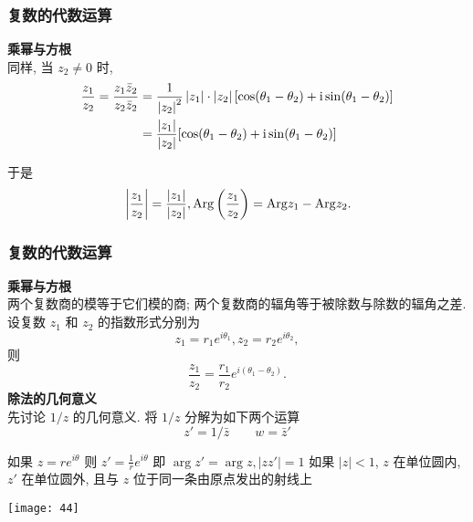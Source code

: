 \documentclass{beamer}
\begin{document}
\begin{frame}[t]
\frametitle{复数的代数运算}
\textbf{乘幂与方根}\\
同样, 当 $ {z_2} \ne 0 $ 时, 
\begin{align*}
\frac{{{z_1}}}{{{z_2}}} = \frac{{{z_1}{{\bar z}_2}}}{{{z_2}{{\bar z}_2}}} &= \frac{1}{{{{\left| {{z_2}} \right|}^2}}}\left| {{z_1}} \right| \cdot \left| {{z_2}} \right|[\cos ({\theta _1} - {\theta _2}) + {\rm{i}}\sin ({\theta _1} - {\theta _2})]\\
&= \frac{{\left| {{z_1}} \right|}}{{\left| {{z_2}} \right|}}[\cos ({\theta _1} - {\theta _2}) + {\rm{i}}\sin ({\theta _1} - {\theta _2})]
\end{align*}

于是
\[ {\rm{ }}\left| {\frac{{{z_1}}}{{{z_2}}}} \right| = \frac{{\left| {{z_1}} \right|}}{{\left| {{z_2}} \right|}}, {\rm{Arg}}\left( {\frac{{{z_1}}}{{{z_2}}}} \right) = {\rm{Arg}}{z_1} - {\rm{Arg}}{z_2}.\]
\end{frame}

\begin{frame}[t]
\frametitle{复数的代数运算}
\textbf{乘幂与方根}\\
两个复数商的模等于它们模的商; 两个复数商的辐角等于被除数与除数的辐角之差.
设复数 $ {z_1} $ 和 $ {z_2} $ 的指数形式分别为
\[ {z_1} = {r_1}{e^{i{\theta _1}}}, {z_2} = {r_2}{e^{i{\theta _2}}}, \]
则
\[\frac{{{z_1}}}{{{z_2}}} = \frac{{{r_1}}}{{{r_2}}}{e^{i({\theta _1} - {\theta _2})}}.\]
\textbf{除法的几何意义}\\

先讨论 $ 1/z $ 的几何意义. 将 $ 1/z $ 分解为如下两个运算
\[ {{z'}} = 1/{{\bar z}} \qquad {{w}} = {{\bar z'}}\]

\begin{minipage}{0.55\linewidth}
如果 $ {{z}} = {{r}}{e^{{{i\theta }}}} $ 
则 $ {{z'}} = \frac{1}{{{r}}}{e^{{{i\theta }}}} $ 
即 $ \arg z'=\arg z, |zz'|=1 $ 
如果 $ |z|<1 $,  $ z $ 在单位圆内, $ z' $ 在单位圆外, 且与 $ z $ 位于同一条由原点发出的射线上
\end{minipage}\qquad
\begin{minipage}{0.25\linewidth}
\texttt{[image: 44]}
\end{minipage}

\end{frame}
\end{document}
